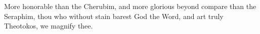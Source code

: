 More honorable than the Cherubim, and more glorious beyond compare than the Seraphim, thou who without stain barest God the Word, and art truly Theotokos, we magnify thee.
